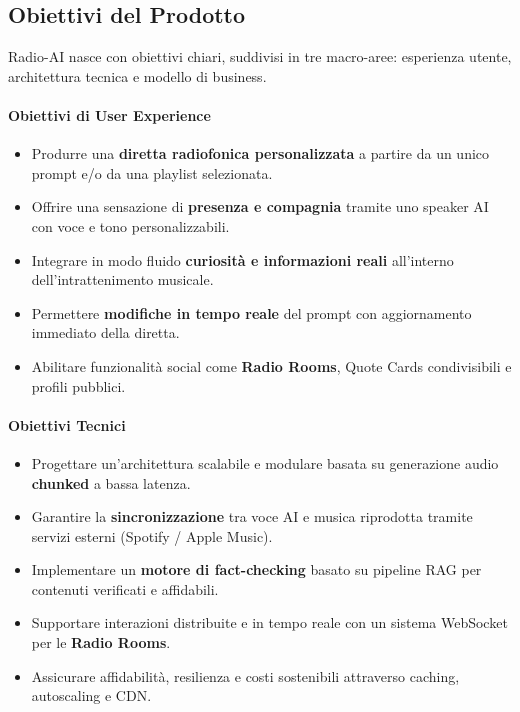 \documentclass[11pt,a4paper]{article}
\begin{document}
\subsection{Obiettivi del Prodotto}

Radio-AI nasce con obiettivi chiari, suddivisi in tre macro-aree: esperienza utente, architettura tecnica e modello di business.

\paragraph{Obiettivi di User Experience}
\begin{itemize}
    \item Produrre una \textbf{diretta radiofonica personalizzata} a partire da un unico prompt e/o da una playlist selezionata.
    \item Offrire una sensazione di \textbf{presenza e compagnia} tramite uno speaker AI con voce e tono personalizzabili.
    \item Integrare in modo fluido \textbf{curiosità e informazioni reali} all’interno dell’intrattenimento musicale.
    \item Permettere \textbf{modifiche in tempo reale} del prompt con aggiornamento immediato della diretta.
    \item Abilitare funzionalità social come \textbf{Radio Rooms}, Quote Cards condivisibili e profili pubblici.
\end{itemize}

\paragraph{Obiettivi Tecnici}
\begin{itemize}
    \item Progettare un’architettura scalabile e modulare basata su generazione audio \textbf{chunked} a bassa latenza.
    \item Garantire la \textbf{sincronizzazione} tra voce AI e musica riprodotta tramite servizi esterni (Spotify / Apple Music).
    \item Implementare un \textbf{motore di fact-checking} basato su pipeline RAG per contenuti verificati e affidabili.
    \item Supportare interazioni distribuite e in tempo reale con un sistema WebSocket per le \textbf{Radio Rooms}.
    \item Assicurare affidabilità, resilienza e costi sostenibili attraverso caching, autoscaling e CDN.
\end{itemize}
\end{document}
